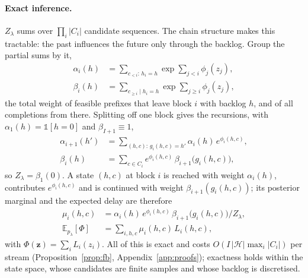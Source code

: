 \paragraph{Exact inference.} $Z_\lambda$ sums over $\prod_i|C_i|$ candidate sequences. The chain structure makes this
tractable: the past influences the future only through the backlog. Group the partial sums by it,
\begin{equation}
\begin{aligned}
\alpha_i(h)&=\textstyle\sum_{c_{<i}:\,h_i=h}\exp\sum_{j<i}\phi_j(z_j),\\
\beta_i(h)&=\textstyle\sum_{c_{\ge i}\mid h_i=h}\exp\sum_{j\ge i}\phi_j(z_j),
\end{aligned}
\label{eq:msg}
\end{equation}
the total weight of feasible prefixes that leave block $i$ with backlog $h$, and of all completions from there.
Splitting off one block gives the recursions, with $\alpha_1(h)=\mathds{1}[h=0]$ and $\beta_{I+1}\equiv1$,
\begin{equation}
\begin{aligned}
\alpha_{i+1}(h')&=\textstyle\sum_{(h,c):\,g_i(h,c)=h'}\alpha_i(h)\,e^{\phi_i(h,c)},\\
\beta_i(h)&=\textstyle\sum_{c\in C_i}e^{\phi_i(h,c)}\,\beta_{i+1}\big(g_i(h,c)\big),
\end{aligned}
\label{eq:fb}
\end{equation}
so $Z_\lambda=\beta_1(0)$. A state $(h,c)$ at block $i$ is reached with weight $\alpha_i(h)$, contributes
$e^{\phi_i(h,c)}$ and is continued with weight $\beta_{i+1}(g_i(h,c))$; its posterior marginal and the expected
delay are therefore
\begin{equation}
\begin{aligned}
\mu_i(h,c)&=\alpha_i(h)\,e^{\phi_i(h,c)}\,\beta_{i+1}\big(g_i(h,c)\big)/Z_\lambda,\\
\mathbb{E}_{p_\lambda}[\Phi]&=\textstyle\sum_{i,h,c}\mu_i(h,c)\,L_i(h,c),
\end{aligned}
\label{eq:marg}
\end{equation}
with $\Phi(\bm{z})=\sum_iL_i(z_i)$. All of this is exact and costs $O(I\,|\mathcal{H}|\max_i|C_i|)$ per stream
(Proposition~\ref{prop:fb}, Appendix~\ref{app:proofs}); exactness holds within the state space, whose candidates are
finite samples and whose backlog is discretised.

